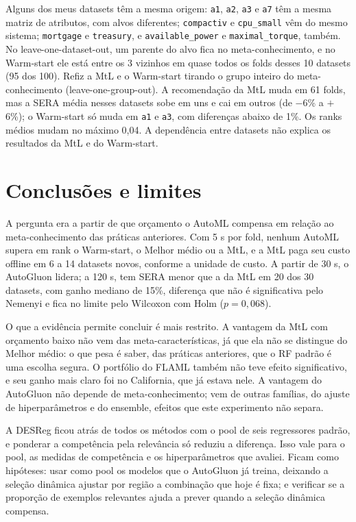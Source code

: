 \documentclass[10pt,a4paper]{article}
\begin{document}
Alguns dos meus datasets têm a mesma origem: \texttt{a1}, \texttt{a2}, \texttt{a3} e \texttt{a7} têm a mesma matriz de atributos, com alvos diferentes; \texttt{compactiv} e \texttt{cpu\_small} vêm do mesmo sistema; \texttt{mortgage} e \texttt{treasury}, e \texttt{available\_power} e \texttt{maximal\_torque}, também. No leave-one-dataset-out, um parente do alvo fica no meta-conhecimento, e no Warm-start ele está entre os 3 vizinhos em quase todos os folds desses 10 datasets (95 dos 100). Refiz a MtL e o Warm-start tirando o grupo inteiro do meta-conhecimento (leave-one-group-out). A recomendação da MtL muda em 61 folds, mas a SERA média nesses datasets sobe em uns e cai em outros (de $-$6\% a $+$6\%); o Warm-start só muda em \texttt{a1} e \texttt{a3}, com diferenças abaixo de 1\%. Os ranks médios mudam no máximo 0,04. A dependência entre datasets não explica os resultados da MtL e do Warm-start.

\section{Conclusões e limites}

A pergunta era a partir de que orçamento o AutoML compensa em relação ao meta-conhecimento das práticas anteriores. Com 5 s por fold, nenhum AutoML supera em rank o Warm-start, o Melhor médio ou a MtL, e a MtL paga seu custo offline em 6 a 14 datasets novos, conforme a unidade de custo. A partir de 30 s, o AutoGluon lidera; a 120 s, tem SERA menor que a da MtL em 20 dos 30 datasets, com ganho mediano de 15\%, diferença que não é significativa pelo Nemenyi e fica no limite pelo Wilcoxon com Holm ($p=0{,}068$).

O que a evidência permite concluir é mais restrito. A vantagem da MtL com orçamento baixo não vem das meta-características, já que ela não se distingue do Melhor médio: o que pesa é saber, das práticas anteriores, que o RF padrão é uma escolha segura. O portfólio do FLAML também não teve efeito significativo, e seu ganho mais claro foi no California, que já estava nele. A vantagem do AutoGluon não depende de meta-conhecimento; vem de outras famílias, do ajuste de hiperparâmetros e do ensemble, efeitos que este experimento não separa.

A DESReg ficou atrás de todos os métodos com o pool de seis regressores padrão, e ponderar a competência pela relevância só reduziu a diferença. Isso vale para o pool, as medidas de competência e os hiperparâmetros que avaliei. Ficam como hipóteses: usar como pool os modelos que o AutoGluon já treina, deixando a seleção dinâmica ajustar por região a combinação que hoje é fixa; e verificar se a proporção de exemplos relevantes ajuda a prever quando a seleção dinâmica compensa.
\end{document}

